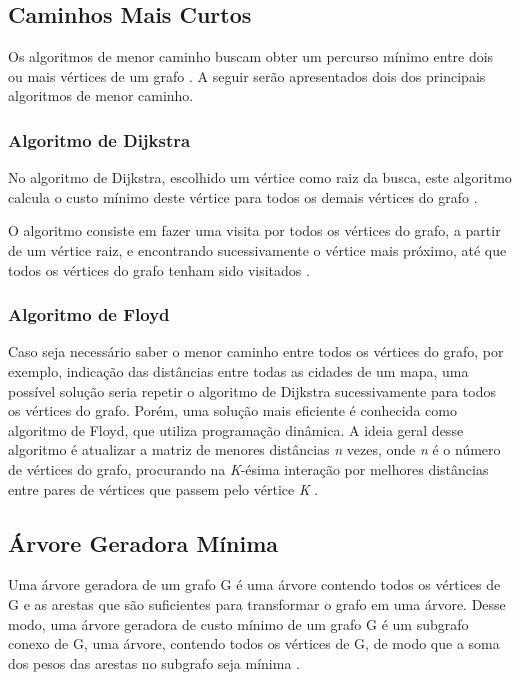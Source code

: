 \subsection{Caminhos Mais Curtos}

Os algoritmos de menor caminho buscam obter um percurso mínimo entre dois ou mais vértices de um grafo \cite{Cormen:2001}. A seguir serão apresentados dois dos principais algoritmos de menor caminho.

\subsubsection{Algoritmo de Dijkstra}

No algoritmo de Dijkstra, escolhido um vértice como raiz da busca, este algoritmo calcula o custo mínimo deste vértice para todos os demais vértices do grafo \cite{Cormen:2001}.

O algoritmo consiste em fazer uma visita por todos os vértices do grafo, a partir de um vértice raiz, e encontrando sucessivamente o vértice mais próximo, até que todos os vértices do grafo tenham sido visitados \cite{Cormen:2001}.

\subsubsection{Algoritmo de Floyd}

Caso seja necessário saber o menor caminho entre todos os vértices do grafo, por exemplo, indicação das distâncias entre todas as cidades de um mapa, uma possível solução seria repetir o algoritmo de Dijkstra sucessivamente para todos os vértices do grafo. Porém, uma solução mais eficiente é conhecida como algoritmo de Floyd, que utiliza programação dinâmica. A ideia geral desse algoritmo é atualizar a matriz de menores distâncias \textit{n} vezes, onde \textit{n} é o número de vértices do grafo, procurando na \textit{K}-ésima interação por melhores distâncias entre pares de vértices que passem pelo vértice \textit{K} \cite{Sampaio:2005}.

\subsection{Árvore Geradora Mínima}

Uma árvore geradora de um grafo G é uma árvore contendo todos os vértices de G e as arestas que são suficientes para transformar o grafo em uma árvore. Desse modo, uma árvore geradora de custo mínimo de um grafo G é um subgrafo conexo de G, uma árvore, contendo todos os vértices de G, de modo que a soma dos pesos das arestas no subgrafo seja mínima \cite{Rezende:2002}.

